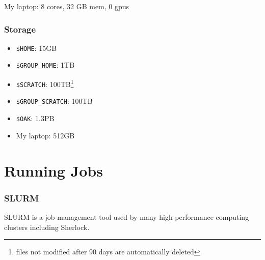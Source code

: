 \documentclass[aspectratio=169]{beamer}
\begin{document}
\begin{frame}
\begin{center}
	\end{center}
	My laptop: 8 cores, 32 GB mem, 0 gpus
\end{frame}

\begin{frame}
	\frametitle{Storage}
	\begin{itemize}
		\item \texttt{\$HOME}: 15GB
		\item \texttt{\$GROUP\_HOME}: 1TB
		\item \texttt{\$SCRATCH}: 100TB\footnote{files not modified after 90 days are automatically deleted}
		\item \texttt{\$GROUP\_SCRATCH}: 100TB\footnotemark[\value{footnote}]
		\item \texttt{\$OAK}: 1.3PB
		\item My laptop: 512GB
	\end{itemize}
\end{frame}


\section{Running Jobs}

\frame{\sectionpage}

\begin{frame}[t]
	\frametitle{SLURM}
		SLURM is a job management tool used by many high-performance computing clusters including Sherlock.
\end{frame}
\end{document}
